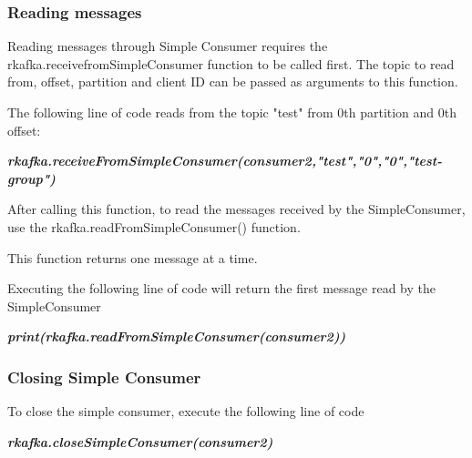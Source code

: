 \documentclass[english,pdftex,a4paper]{article}
\begin{document}
\subsubsection{\textbf{Reading messages}}
\par{Reading messages through Simple Consumer requires the rkafka.receivefromSimpleConsumer function to be called first. The topic to read from, offset, partition and client ID can be passed as arguments to this function.}
\par{The following line of code reads from the topic "test" from 0th partition and 0th offset:}
\par{\textit{\textbf{rkafka.receiveFromSimpleConsumer(consumer2,"test","0","0","test-group")}}}
\par{After calling this function, to read the messages received by the SimpleConsumer,
use the rkafka.readFromSimpleConsumer() function.}
\par{This function returns one message at a time.}
\par{Executing the following line of code will return the first message read by the SimpleConsumer}
\par{\textit{\textbf{print(rkafka.readFromSimpleConsumer(consumer2))}}}
\subsubsection{\textbf{Closing Simple Consumer}}
\par{To close the simple consumer, execute the following line of code}
\par{\textit{\textbf{rkafka.closeSimpleConsumer(consumer2)}}}
\end{document}
